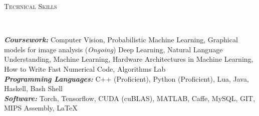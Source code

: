 \documentclass[9pt]{article}
\newenvironment{changemargin}[2]{%
  \begin{list}{}{%
      \setlength{\topsep}{0pt}%
    \setlength{\leftmargin}{#1}%
    \setlength{\rightmargin}{#2}%
    \setlength{\listparindent}{\parindent}%
  \setlength{\itemindent}{\parindent}%
    \setlength{\parsep}{\parskip}%
    }%
  \item[]}{\end{list}
    }
\newcommand{\lineover}{
  \begin{changemargin}{-0.05in}{-0.10in}
    \vspace*{-9pt}
    \hrulefill \\
    \vspace*{-2pt}
  \end{changemargin}
}
\newcommand{\header}[1]{
  \begin{changemargin}{-0.5in}{-0.5in}
    \scshape{#1}\\
        \lineover
  \end{changemargin}
}
\newenvironment{body} {
  \vspace*{-16pt}
        \begin{changemargin}{-0.6in}{-0.65in}
        }	
        {\end{changemargin}
}
\begin{document}
\vspace{3 mm}
\header{Technical Skills}

\vspace{3 mm}
\begin{body}
  \vspace{14pt}
        \begin{changemargin}{0.15in}{0.15in}
          \emph{\textbf{Coursework:}} Computer Vision, Probabilistic Machine Learning,
          Graphical models for image analysis (\emph{Ongoing})
          Deep Learning, Natural Language Understanding, Machine 
          Learning, Hardware Architectures in Machine Learning, 
          How to Write Fast Numerical Code, Algorithms Lab \\
          \emph{\textbf{Programming Languages: }}{} C++ (Proficient), Python (Proficient), 
          Lua, Java, Haskell, Bash Shell\\
          \emph{\textbf{Software: }}{} Torch, Tensorflow, CUDA (cuBLAS), MATLAB, 
          Caffe, MySQL, GIT, MIPS Assembly, \LaTeX \\
        \end{changemargin}
\end{body}
\end{document}
